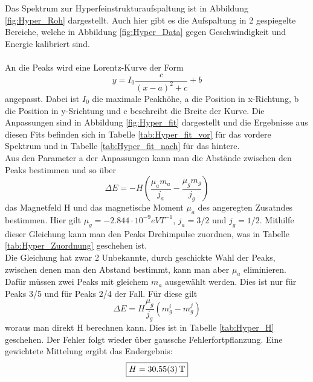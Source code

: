 \documentclass[12pt,a4paper]{article}
\begin{document}
Das Spektrum zur Hyperfeinstrukturaufspaltung ist in Abbildung \ref{fig:Hyper_Roh} dargestellt. Auch hier gibt es die Aufspaltung in 2 gespiegelte Bereiche, welche in Abbildung \ref{fig:Hyper_Data} gegen Geschwindigkeit und Energie kalibriert sind.\\
\\
An die Peaks wird eine Lorentz-Kurve der Form
\begin{equation}
y = I_0 \dfrac{c}{(x-a)^2+c}+b
\end{equation}
angepasst. Dabei ist $I_0$ die maximale Peakhöhe, a die Position in x-Richtung, b die Position in y-Srichtung und c beschreibt die Breite der Kurve.
Die Anpassungen sind in Abbildung \ref{fig:Hyper_fit} dargestellt und die Ergebnisse aus diesen Fits befinden sich in Tabelle \ref{tab:Hyper_fit_vor} für das vordere Spektrum und in Tabelle \ref{tab:Hyper_fit_nach} für das hintere.
\\
Aus den Parameter a der Anpassungen kann man die Abstände zwischen den Peaks bestimmen und so über 
\begin{equation}
\Delta E = -H\left(\dfrac{\mu_a m_a}{j_a}-\dfrac{\mu_g m_g}{j_g}\right)
\label{eq:Hyper}
\end{equation}
das Magnetfeld H und das magnetische Moment $\mu_a$ des angeregten Zusatndes bestimmen. Hier gilt $\mu_g = -2.844\cdot 10^{-9}eVT^{-1}$, $j_a = 3/2$ und $j_g = 1/2$.  Mithilfe dieser Gleichung kann man den Peaks Drehimpulse zuordnen, was in Tabelle \ref{tab:Hyper_Zuordnung} geschehen ist.\\
Die Gleichung hat zwar 2 Unbekannte, durch geschickte Wahl der Peaks, zwischen denen man den Abstand bestimmt, kann man aber $\mu_a$ eliminieren. Dafür müssen zwei Peaks mit gleichem $m_a$ ausgewählt werden. Dies ist nur für Peaks 3/5 und für Peaks 2/4 der Fall. Für diese gilt
\begin{equation}
\Delta E = H\dfrac{\mu_g}{j_g}(m_{g}^i-m_{g}^j)
\end{equation}
woraus man direkt H berechnen kann. Dies ist in Tabelle \ref{tab:Hyper_H} geschehen. Der Fehler folgt wieder über gaussche Fehlerfortpflanzung. Eine gewichtete Mittelung ergibt das Endergebnis:
\begin{equation*}
\boxed{H = \SI{30.55\pm 0.03}{T}}
\end{equation*}
\end{document}
